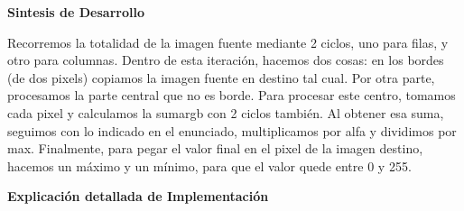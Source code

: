 \begin{center}
\textbf{Sintesis de Desarrollo} 
\end{center}

Recorremos la totalidad de la imagen fuente mediante 2 ciclos, uno para filas, y otro para columnas.
Dentro de esta iteración, hacemos dos cosas: en los bordes (de dos pixels) copiamos la imagen fuente en destino tal cual.
Por otra parte, procesamos la parte central que no es borde. Para procesar este centro, tomamos cada pixel y calculamos la 
sumargb con 2 ciclos también. Al obtener esa suma, seguimos con lo indicado en el enunciado, multiplicamos por alfa y dividimos
por max. \newline
Finalmente, para pegar el valor final en el pixel de la imagen destino, hacemos un máximo y un mínimo, 
para que el valor quede entre 0 y 255.



\begin{center}
\textbf{Explicación detallada de Implementación}

\end{center}

